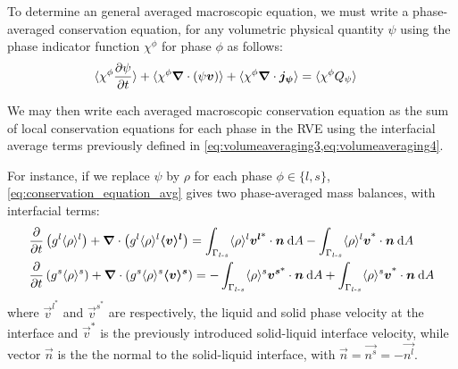 To determine an general averaged macroscopic equation, we must write
a phase-averaged conservation equation, for any volumetric physical quantity $\psi$ using the phase indicator function
$\chi^\phi$ for phase $\phi$ as follows: 
\begin{align}
\label{eq:conservation_equation_avg}
& \langle \chi^\phi \frac{\partial \psi}{\partial t}  \rangle + \langle \chi^\phi \boldsymbol{\nabla} \cdot \left( \psi \boldsymbol{v} \right) \rangle + \langle \chi^\phi \boldsymbol{\nabla} \cdot \boldsymbol{j_{\psi}} \rangle = \langle \chi^\phi Q_{\psi} \rangle
\end{align}

We may then write each averaged macroscopic conservation
equation as the sum of local conservation equations for each phase in the RVE using the 
interfacial average terms previously defined in \cref{eq:volumeaveraging3,eq:volumeaveraging4}.

For instance, if we replace $\psi$ by $\rho$ for each phase $\phi \in \{l,s\}$, \cref{eq:conservation_equation_avg} 
gives two phase-averaged mass balances, with interfacial terms:
\begin{subequations}
\begin{align}
\label{eq:mass_liquid}
& \frac{\partial}{\partial t} \left( {g^l} \langle \rho \rangle^l \right)  + \boldsymbol{\nabla} \cdot \left( {g^l} \langle \rho \rangle^l \boldsymbol{\langle v \rangle^l} \right) =
  \int_{\Gamma_{l\text{-}s}} \langle \rho \rangle^l \boldsymbol{v^{l \text{*}}} \cdot \boldsymbol{n}\: \mathrm{d}A - \int_{\Gamma_{l\text{-}s}} \langle \rho \rangle^l \boldsymbol{v^\text{*}} \cdot \boldsymbol{n}\: \mathrm{d}A \\
\label{eq:mass_solid}
& \frac{\partial}{\partial t} \left( {g^s} \langle \rho \rangle^s \right)  + \boldsymbol{\nabla} \cdot \left( {g^s} \langle \rho \rangle^s \boldsymbol{\langle v \rangle^s} \right) = -\int_{\Gamma_{l\text{-}s}} \langle \rho \rangle^s \boldsymbol{v^{s \text{*}}} \cdot \boldsymbol{n}\: \mathrm{d}A + \int_{\Gamma_{l\text{-}s}} \langle \rho \rangle^s \boldsymbol{v^\text{*}} \cdot \boldsymbol{n}\: \mathrm{d}A
\end{align}
\end{subequations}
where $\vec{v}^{l^*}$ and $\vec{v}^{s^*}$ are respectively, the liquid 
and solid phase velocity at the interface and $\vec{v}^*$ is the previously introduced solid-liquid interface velocity, while vector $\vec{n}$ is the the normal to the solid-liquid interface, with $\vec{n}=\vec{n^s}=-\vec{n^l}$.


